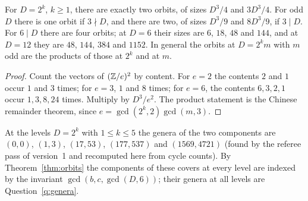 \begin{corollary}\label{cor:orbits}
For $D=2^k$, $k\ge1$, there are exactly two orbits, of sizes $D^3/4$ and $3D^3/4$. For odd $D$ there is one orbit if $3\nmid D$, and there are two, of sizes $D^3/9$ and $8D^3/9$, if $3\mid D$. For $6\mid D$ there are four orbits; at $D=6$ their sizes are $6$, $18$, $48$ and $144$, and at $D=12$ they are $48$, $144$, $384$ and $1152$. In general the orbits at $D=2^km$ with $m$ odd are the products of those at $2^k$ and at $m$.
\end{corollary}
\begin{proof}
Count the vectors of $(\mathbb{Z}/e)^2$ by content. For $e=2$ the contents $2$ and $1$ occur $1$ and $3$ times; for $e=3$, $1$ and $8$ times; for $e=6$, the contents $6,3,2,1$ occur $1,3,8,24$ times. Multiply by $D^3/e^2$. The product statement is the Chinese remainder theorem, since $e=\gcd(2^k,2)\gcd(m,3)$.
\end{proof}

At the levels $D=2^k$ with $1\le k\le5$ the genera of the two components are $(0,0)$, $(1,3)$, $(17,53)$, $(177,537)$ and $(1569,4721)$ (found by the referee pass of version~1 and recomputed here from cycle counts). By Theorem~\ref{thm:orbits} the components of these covers at every level are indexed by the invariant $\gcd(b,c,\gcd(D,6))$; their genera at all levels are Question~\ref{q:genera}.
